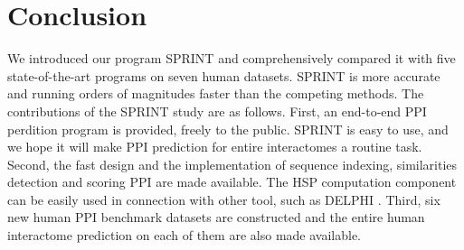 \section{Conclusion}
We introduced our program SPRINT and comprehensively compared it with five state-of-the-art programs on seven human datasets. SPRINT is more accurate and running orders of magnitudes faster than the competing methods. The contributions of the SPRINT study are as follows.
First, an end-to-end PPI perdition program is provided, freely to the public. SPRINT is easy to use, and we hope it will make PPI prediction for entire interactomes a routine task. Second, the fast design and the implementation of sequence indexing, similarities detection and scoring PPI are made available. The HSP computation component can be easily used in connection with other tool, such as DELPHI \cite{li2020delphi}. Third, six new human PPI benchmark datasets are constructed and the entire human interactome prediction on each of them are also made available.